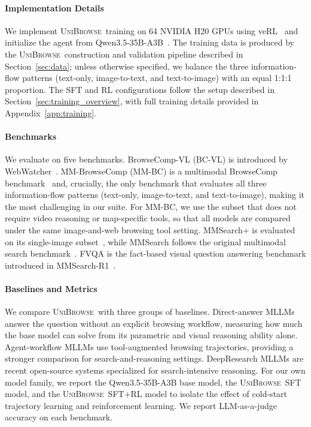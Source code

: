 \documentclass[11pt]{article}
\newcommand{\modelname}{\textsc{UniBrowse}}
\begin{document}
\paragraph{Implementation Details}
We implement \modelname\ training on 64 NVIDIA H20 GPUs using veRL~\citep{wu2025hybridflow} and initialize the agent from Qwen3.5-35B-A3B~\citep{qwen35blog}. The training data is produced by the \modelname\ construction and validation pipeline described in Section~\ref{sec:data}; unless otherwise specified, we balance the three information-flow patterns (text-only, image-to-text, and text-to-image) with an equal 1:1:1 proportion. The SFT and RL configurations follow the setup described in Section~\ref{sec:training_overview}, with full training details provided in Appendix~\ref{app:training}.


\paragraph{Benchmarks}
We evaluate on five benchmarks. BrowseComp-VL (BC-VL) is introduced by WebWatcher~\citep{geng2025webwatcher}. MM-BrowseComp (MM-BC) is a multimodal BrowseComp benchmark~\citep{li2025mm} and, crucially, the only benchmark that evaluates all three information-flow patterns (text-only, image-to-text, and text-to-image), making it the most challenging in our suite. For MM-BC, we use the subset that does not require video reasoning or map-specific tools, so that all models are compared under the same image-and-web browsing tool setting. MMSearch+ is evaluated on its single-image subset~\citep{tao2025mmsearch}, while MMSearch follows the original multimodal search benchmark~\citep{jiang2024mmsearch}. FVQA is the fact-based visual question answering benchmark introduced in MMSearch-R1~\citep{wu2025mmsearch}.

\paragraph{Baselines and Metrics}
We compare \modelname\ with three groups of baselines. Direct-answer MLLMs answer the question without an explicit browsing workflow, measuring how much the base model can solve from its parametric and visual reasoning ability alone. Agent-workflow MLLMs use tool-augmented browsing trajectories, providing a stronger comparison for search-and-reasoning settings. DeepResearch MLLMs are recent open-source systems specialized for search-intensive reasoning. For our own model family, we report the Qwen3.5-35B-A3B base model, the \modelname\ SFT model, and the \modelname\ SFT+RL model to isolate the effect of cold-start trajectory learning and reinforcement learning. We report LLM-as-a-judge accuracy on each benchmark.
\end{document}

